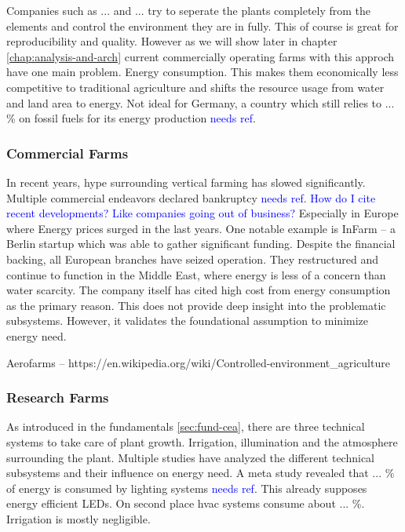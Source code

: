Companies such as ... and ... try to seperate the plants completely from the elements and control the environment they are in fully.
This of course is great for reproducibility and quality.
However as we will show later in chapter \ref{chap:analysis-and-arch} current commercially operating farms with this approch have one main problem.
Energy consumption.
This makes them economically less competitive to traditional agriculture and shifts the resource usage from water and land area to energy.
Not ideal for Germany, a country which still relies to ... \% on fossil fuels for its energy production \textcolor{blue}{needs ref}.

\subsubsection{Commercial Farms}
\label{subsub:prop-ener-commercialfarms}
In recent years, hype surrounding vertical farming has slowed significantly.
Multiple commercial endeavors declared bankruptcy \textcolor{Blue}{needs ref}.
\textcolor{Blue}{How do I cite recent developments? Like companies going out of business?}
Especially in Europe where Energy prices surged in the last years.
One notable example is InFarm -- a Berlin startup which was able to gather significant funding.
Despite the financial backing, all European branches have seized operation.
They restructured and continue to function in the Middle East, where energy is less of a concern than water scarcity.
The company itself has cited high cost from energy consumption as the primary reason.
This does not provide deep insight into the problematic subsystems.
However, it validates the foundational assumption to minimize energy need.

Aerofarms -- https://en.wikipedia.org/wiki/Controlled-environment\_agriculture

\subsubsection{Research Farms}
As introduced in the fundamentals \ref{sec:fund-cea}, there are three technical systems to take care of plant growth.
Irrigation, illumination and the atmosphere surrounding the plant.
Multiple studies have analyzed the different technical subsystems and their influence on energy need.
A meta study revealed that ... \% of energy is consumed by lighting systems \textcolor{Blue}{needs ref}.
This already supposes energy efficient LEDs.
On second place \ac{hvac} systems consume about ... \%.
Irrigation is mostly negligible.

